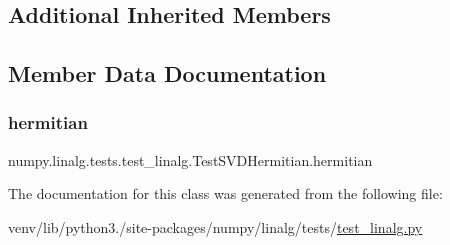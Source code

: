 \subsection*{Additional Inherited Members}


\subsection{Member Data Documentation}
\mbox{\label{classnumpy_1_1linalg_1_1tests_1_1test__linalg_1_1TestSVDHermitian_ac7443c7388da03bfe7128cf187b88269}} 
\subsubsection{\texorpdfstring{hermitian}{hermitian}}
{\footnotesize\ttfamily numpy.\+linalg.\+tests.\+test\+\_\+linalg.\+Test\+S\+V\+D\+Hermitian.\+hermitian\hspace{0.3cm}{\ttfamily [static]}}



The documentation for this class was generated from the following file\+:\begin{DoxyCompactItemize}
\item 
venv/lib/python3./site-\/packages/numpy/linalg/tests/\hyperlink{test__linalg_8py}{test\+\_\+linalg.\+py}\end{DoxyCompactItemize}
